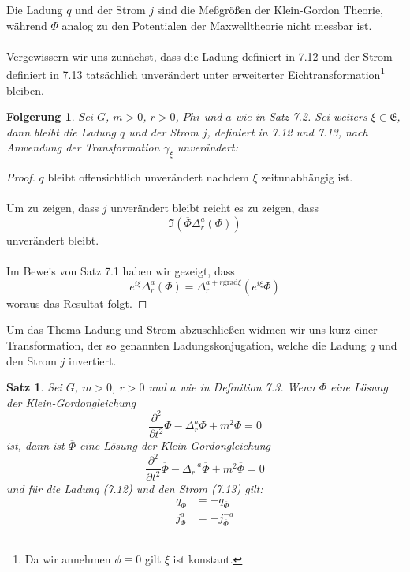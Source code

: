 \documentclass[11pt,a4paper,leqno]{report}
\newtheorem{proposition}{Satz}[chapter]
\newtheorem{corollary}[theorem]{Folgerung}
\numberwithin{equation}{chapter}
\begin{document}
\noindent
Die Ladung $q$ und der Strom $j$ sind die Me\ss{}gr\"o\ss{}en der Klein-Gordon Theorie, w\"ahrend $\Phi$ analog zu den Potentialen der Maxwelltheorie nicht messbar ist.\\
\\
Vergewissern wir uns zun\"achst, dass die Ladung definiert in 7.12 und der Strom definiert in 7.13 tats\"achlich unver\"andert unter erweiterter Eichtransformation\footnote{Da wir annehmen $\phi\equiv 0$ gilt $\xi$ ist konstant.} bleiben.
\begin{corollary}
	Sei $G$, $m>0$, $r>0$, $Phi$ und $a$ wie in Satz 7.2. Sei weiters $\xi\in \mathfrak{E}$, dann bleibt die Ladung $q$ und der Strom $j$, definiert in 7.12 und 7.13, nach Anwendung der Transformation $\gamma_\xi$ unver\"andert:
\end{corollary}
\begin{proof}
	$q$ bleibt offensichtlich unver\"andert nachdem $\xi$ zeitunabh\"angig ist.\\
	\\
	Um zu zeigen, dass $j$ unver\"andert bleibt reicht es zu zeigen, dass $$\Im(\overline{\Phi}\Delta^a_r(\Phi))$$ unver\"andert bleibt.\\
	\\
	Im Beweis von Satz 7.1 haben wir gezeigt, dass 
	\begin{equation*}
		e^{i\xi}\Delta_r^a(\Phi) = \Delta_r^{a + r\text{grad}\xi}(e^{i\xi}\Phi)
	\end{equation*}
	woraus das Resultat folgt.
\end{proof}
\noindent
Um das Thema Ladung und Strom abzuschlie\ss{}en widmen wir uns kurz einer Transformation, der so genannten Ladungskonjugation, welche die Ladung $q$ und den Strom $j$ invertiert. 
\begin{proposition}
	Sei $G$, $m>0$, $r>0$ und $a$ wie in Definition 7.3. Wenn $\Phi$ eine L\"osung der Klein-Gordongleichung
	\begin{equation}
		\frac{\partial^2}{\partial t^2}\Phi - \Delta^{a}_r\Phi+ m^2 \Phi = 0
	\end{equation}
	ist, dann ist $\overline{\Phi}$ eine L\"osung der Klein-Gordongleichung
	\begin{equation}
		\frac{\partial^2}{\partial t^2}\overline{\Phi} - \Delta^{-a}_r\overline{\Phi}+ m^2 \overline{\Phi} = 0
	\end{equation}
	und f\"ur die Ladung (7.12) und den Strom (7.13) gilt:
	\begin{align}
		q_\Phi &= - q_{\overline{\Phi}}\\
		j_\Phi^a &= - j_{\overline{\Phi}}^{-a}
	\end{align}
\end{proposition}
\end{document}
